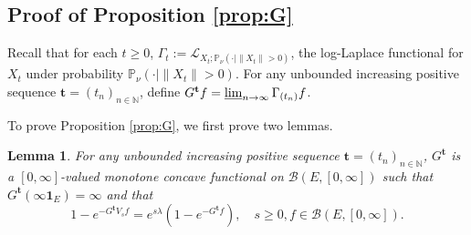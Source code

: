 \documentclass[12pt,a4paper]{amsart}
\numberwithin{equation}{section}
\theoremstyle{plain}
\newtheorem{lem}[thm]{Lemma}
\theoremstyle{definition}
\theoremstyle{remark}
\begin{document}
\subsection{Proof of Proposition \ref{prop:G}}\label{sec:G}
	Recall that for each $t\geq 0$, $\Gamma_t :=
		\mathscr L_{X_t;\mathbb P_\nu(\cdot | \|X_t\|>0)}$,
	the log-Laplace functional for $X_t$ under probability
	$\mathbb P_\nu(\cdot | \|X_t\|>0)$.
	For any unbounded increasing positive sequence $\mathbf t = (t_n)_{n\in \mathbb N}$, define $G^\mathbf t f = \varliminf_{n\to \infty} \Gamma_{(t_n)} f$.

	To prove Proposition \ref{prop:G}, we first prove two lemmas.

\begin{lem} \label{prop:Gtb:H1:H2:H3:H4}
	For any unbounded increasing positive sequence $\mathbf t = (t_n)_{n\in \mathbb N}$,
	$G^\mathbf t$ is a $[0,\infty]$-valued monotone concave functional on $\mathcal B(E,[0,\infty])$
	such that $G^{\mathbf t}(\infty \mathbf 1_E) = \infty$ and that
\begin{equation}
	1 - e^{-G^\mathbf t V_s f}
	= e^{s\lambda} (1-e^{- G^\mathbf t f}),
	\quad s\geq 0, f\in \mathcal B(E,[0,\infty]).
\end{equation}
\end{lem}
\end{document}
